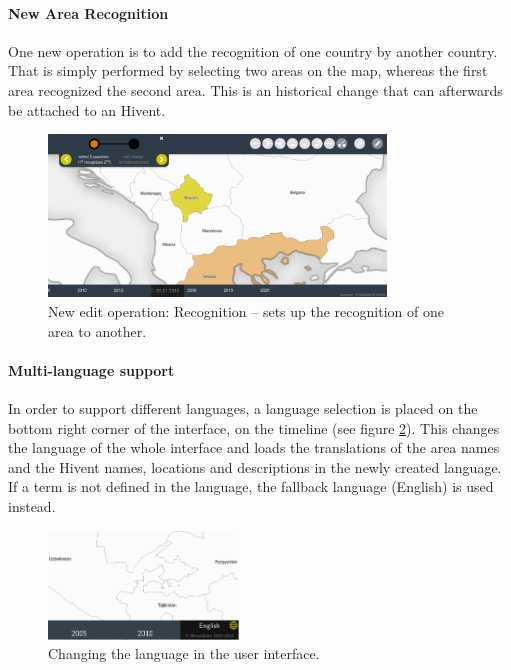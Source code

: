


\paragraph{New Area Recognition} %
\label{par:new_area_recognition}

One new operation is to add the recognition of one country by another country. That is simply performed by selecting two areas on the map, whereas the first area recognized the second area. This is an historical change that can afterwards be attached to an Hivent.

\begin{figure}[H]
  \centering
  \includegraphics[width = 0.8\textwidth]{graphics/uncertainty/operation_REC}
  \caption{New edit operation: Recognition -- sets up the recognition of one area to another.}
  \label{fig:uncertainty_operation_REC}
\end{figure}



\paragraph{Multi-language support} %
\label{par:multi_language_support}

In order to support different languages, a language selection is placed on the bottom right corner of the interface, on the timeline (see figure \ref{fig:multi_language}). This changes the language of the whole interface and loads the translations of the area names and the Hivent names, locations and descriptions in the newly created language. If a term is not defined in the language, the fallback language (English) is used instead.

\begin{figure}[H]
  \centering
  \includegraphics[width = 0.45\textwidth]{graphics/uncertainty/multi_language}
  \caption{Changing the language in the user interface.}
  \label{fig:multi_language}
\end{figure}


